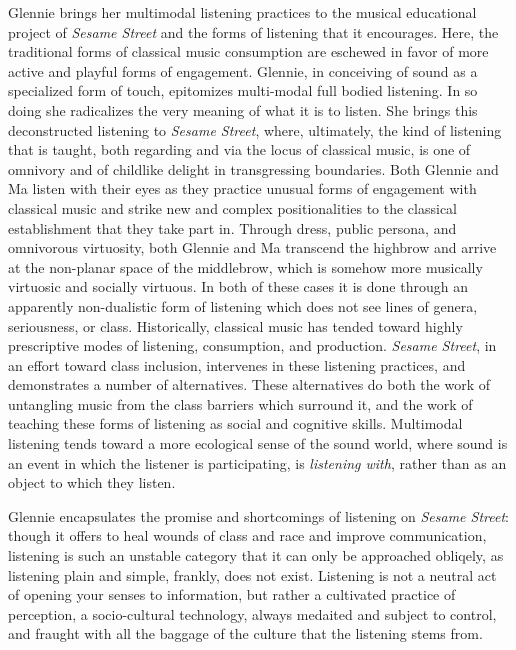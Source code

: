 \documentclass[12pt,letterpaper]{article}
\begin{document}
	Glennie brings her multimodal listening practices to the musical 
	educational project of \textit{Sesame Street} and the forms of
	listening that it encourages. Here, the traditional forms of classical
	music consumption are eschewed in favor of more active and playful 
	forms of engagement. Glennie, in conceiving of sound as a specialized 
	form of touch, epitomizes multi-modal full bodied listening. In so doing
	she radicalizes the very meaning of what it is to listen. She brings 
	this deconstructed listening to \textit{Sesame Street}, where, 
	ultimately, the kind of listening that is  
	taught, both regarding and via the locus of classical music, is one 
	of omnivory and of childlike delight in transgressing boundaries. Both 
	Glennie and Ma listen with their eyes
	as they practice unusual forms of engagement with classical music 
	and strike new and complex positionalities to the classical 
	establishment that they take part in. Through dress, public persona, and
	omnivorous virtuosity, both Glennie
	and Ma transcend the highbrow and arrive at the non-planar space of the 
	middlebrow, which is somehow more musically virtuosic and socially 
	virtuous. In both of these cases it is done through an apparently  
	non-dualistic form of listening which does not see lines of genera, 
	seriousness, or class. Historically, classical music has tended toward
	highly prescriptive modes of listening, consumption, and production. 
	\textit{Sesame Street}, in an effort toward class inclusion, intervenes
	in these listening practices, and demonstrates a number of alternatives.
	These alternatives do both the work of untangling music from the class
	barriers which surround it, and the work of teaching these forms of
	listening as social and cognitive skills. Multimodal listening tends 
	toward a more 
	ecological sense of the sound world, where sound is an event in which 
	the listener is participating, is \textit{listening with}, rather than 
	as an object to which they listen.\autocite[109]{Ceraso}

	Glennie encapsulates the promise and shortcomings of listening on 
	\textit{Sesame Street}: though it offers to heal wounds of class and 
	race and improve communication, listening is such an unstable category 
	that it can only be approached obliqely, as listening plain and simple,
	frankly, does not exist. 
	Listening is not a neutral act of opening your senses to information, 
	but rather a cultivated practice of perception, a socio-cultural 
	technology, always medaited and subject to control, and fraught with all
 	the baggage of the culture that the listening stems from. 
\end{document}
